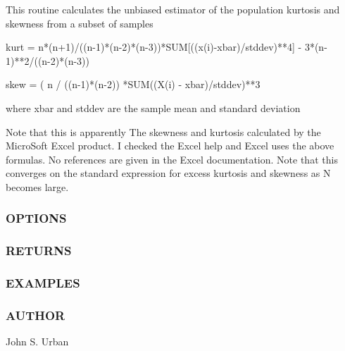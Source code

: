This routine calculates the unbiased estimator of the population kurtosis and skewness from a subset of samples

\begin{DoxyVerb}   kurt = {n*(n+1)/((n-1)*(n-2)*(n-3))*SUM[((x(i)-xbar)/stddev)**4]} -
             3*(n-1)**2/((n-2)*(n-3))

   skew =  ( n / ((n-1)*(n-2)) *SUM{((X(i) - xbar)/stddev)**3}

where xbar and stddev are the sample mean and standard deviation

Note that this is apparently The skewness and kurtosis calculated by the
MicroSoft Excel product.  I checked the Excel help and Excel uses the
above formulas.  No references are given in the Excel documentation. Note
that this converges on the standard expression for excess kurtosis and
skewness as N becomes large.
\end{DoxyVerb}
 \subsubsection*{O\+P\+T\+I\+O\+NS}

\subsubsection*{R\+E\+T\+U\+R\+NS}

\subsubsection*{E\+X\+A\+M\+P\+L\+ES}

\subsubsection*{A\+U\+T\+H\+OR}

John S. Urban \mbox{\label{namespacem__math_a94f09a43f1a68e7971e12ace802dfcc0}} 
